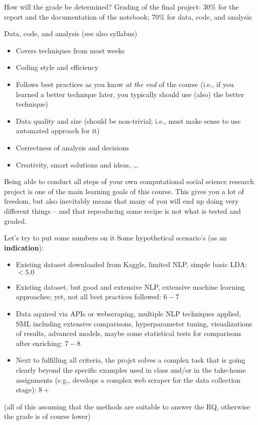 \documentclass[compress]{beamer}
\begin{document}
\begin{frame}{How will the grade be determined?}
Grading of the final project: 30\% for the report and the documentation of the notebook; 70\% for data, code, and analysis


\begin{block}{Data, code, and analysis}
(see also syllabus)
\footnotesize
\begin{itemize}
\item Covers techniques from most weeks
\item Coding style and efficiency
\item Follows best practices as you know \emph{at the end} of the course (i.e., if you learned a better technique later, you typically should use (also) the better technique)
\item Data quality and size (should be non-trivial; i.e., must make sense to use automated approach for it)
\item Correctness of analysis and decisions
\item Creativity, smart solutions and ideas, \ldots
\end{itemize}
\end{block}

\end{frame}

\begin{frame}[standout]
Being able to conduct all steps of your own computational social science research project is one of the main learning goals of this course. This gives you a lot of freedom, but also inevitably means that many of you will end up doing very different things -- and that reproducing some recipe is not what is tested and graded.
\end{frame}

\begin{frame}{Let's try to put some numbers on it}
Some hypothetical scenario's (as an \textbf{indication}):
\footnotesize

\begin{itemize}[<+>]
\item Existing dataset downloaded from Kaggle, limited NLP, simple basic LDA: $<5.0$
\item Existing dataset, but good and extensive NLP, extensive machine learning approaches; yet, not all best practices followed: $6-7$
\item Data aquired via APIs or webscraping, multiple NLP techniques applied, SML including extensive comparisons, hyperparameter tuning, visualizations of results, advanced models, maybe some statistical tests for comparisons after enriching: $7-8$
\item Next to fulfilling all criteria, the projct solves a complex task that is going clearly beyond the specific examples used in class and/or in the take-home assignments (e.g., develops a complex web scraper for the data collection stage): $8+$
\end{itemize}
(all of this assuming that the methods are suitable to answer the RQ, otherwise the grade is of course lower)
\end{frame}
\end{document}
